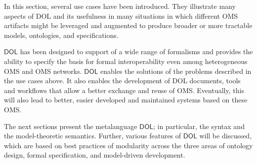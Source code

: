 \documentclass[10pt, a4paper]{isov2}
\newcommand*{\DOL}{\ensuremath{\mathsf{DOL}}\xspace}
\begin{document}


In this section, several use cases have been introduced. They illustrate many aspects of DOL and its usefulness in many situations in which different OMS artifacts might be leveraged and augmented to produce broader or more tractable models, ontologies, and specifications.

 \DOL has been designed to support of a wide range of formalisms and
provides the ability to specify the basis for formal interoperability even among heterogeneous OMS and OMS networks. \DOL enables the solutions of the problems described in the use cases above. It also enables the development of DOL documents, tools and workflows that
allow  a better exchange and reuse of OMS. Eventually, this will also lead to better, easier developed and maintained systems based on these OMS.

The next sections present the metalanguage \DOL{}; in particular, the syntax and the model-theoretic semantics. Further, various features of \DOL will be discussed, which  are based on  best practices of modularity  across
 the three areas of ontology design, formal
specification, and model-driven development.


\end{document}
